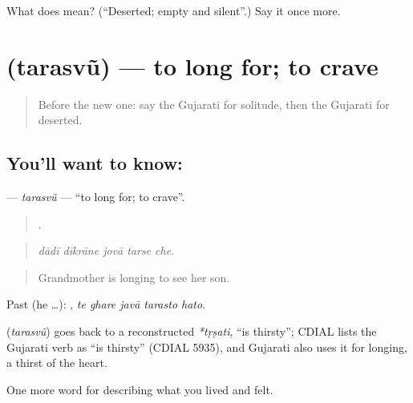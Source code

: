 \begin{tcolorbox}[breakable,colback=teal!4,colframe=teal!35!black,title={Before you move on}]
What does  mean? (\textquotedblleft{}Deserted; empty and silent\textquotedblright{}.) Say it once more.
\end{tcolorbox}
\section[\texorpdfstring{\gu{તરસવું} (tarasvũ)}{તરસવું (tarasvũ)}]{ (tarasvũ) — to long for; to crave}

\label{lesson:GU-C458-tarasvu}



\begin{quote}
Before the new one: say the Gujarati for solitude, then the Gujarati for deserted.
\end{quote}

\subsection*{You'll want to know: }
\textbf{} — \emph{tarasvũ} — \textquotedblleft{}to long for; to crave\textquotedblright{}.

\begin{quote}
    .
\end{quote}

\begin{quote}
\emph{dādī dīkrāne jovā tarse che.}
\end{quote}

\begin{quote}
Grandmother is longing to see her son.
\end{quote}

Past (he …):     , \emph{te ghare javā tarasto hato}.

\begin{cousinweb}
\textbf{} (\emph{tarasvũ}) goes back to a reconstructed \emph{*tṛṣati}, \textquotedblleft{}is thirsty\textquotedblright{}; CDIAL lists the Gujarati verb as \textquotedblleft{}is thirsty\textquotedblright{} (CDIAL 5935), and Gujarati also uses it for longing, a thirst of the heart.
\end{cousinweb}

\begin{grammarlens}[title={What you've built}]
One more word for describing what you lived and felt.
\end{grammarlens}

